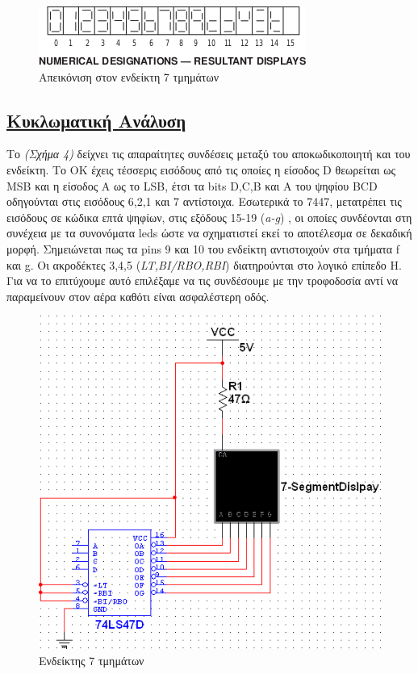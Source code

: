 \documentclass[a4paper,10pt]{article} \usepackage{anysize}
\begin{document}
\begin{figure}[h] 
\caption{Απεικόνιση στον ενδείκτη 7 τμημάτων} 
\centering
\includegraphics[scale=0.9]{files/7-segment_display.png} 
\end{figure}

\pagebreak
\subsection*{\textnormal{\underline{Κυκλωματική Ανάλυση}}} Το \textit{(Σχήμα
4)} δείχνει τις απαραίτητες συνδέσεις μεταξύ του αποκωδικοποιητή και του
ενδείκτη. Το ΟΚ έχεις τέσσερις εισόδους από τις οποίες η είσοδος D θεωρείται ως
MSB και η είσοδος Α ως το LSB, έτσι τα bits D,C,B και A του ψηφίου BCD
οδηγούνται στις εισόδους 6,2,1 και 7 αντίστοιχα. Εσωτερικά το 7447, μετατρέπει
τις εισόδους σε κώδικα επτά ψηφίων, στις εξόδους 15-19 (\textit{a-g}) , οι
οποίες συνδέονται στη συνέχεια με τα συνονόματα leds  ώστε να σχηματιστεί εκεί
το αποτέλεσμα σε δεκαδική μορφή. Σημειώνεται πως τα pins 9 και 10 του ενδείκτη
αντιστοιχούν στα τμήματα f και g.  Οι ακροδέκτες 3,4,5
(\textit{LT,BI/RBO,RBI}) διατηρούνται στο λογικό επίπεδο H. Για να το
επιτύχουμε αυτό επιλέξαμε να τις συνδέσουμε με την τροφοδοσία αντί να
παραμείνουν στον αέρα καθότι είναι ασφαλέστερη οδός.

\begin{figure}[H] 
\caption{Ενδείκτης 7 τμημάτων} 
\centering
\includegraphics[scale=0.7]{files/7-segment.png} 
\end{figure}
\end{document}
